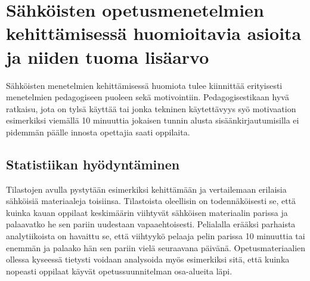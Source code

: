 \documentclass[utf8,bachelor]{gradu3}
\begin{document}
\section{Sähköisten opetusmenetelmien kehittämisessä huomioitavia asioita ja niiden tuoma lisäarvo}
Sähköisten menetelmien kehittämisessä huomiota tulee kiinnittää erityisesti menetelmien pedagogiseen puoleen sekä motivointiin. Pedagogisestikaan hyvä ratkaisu, jota on tylsä käyttää tai jonka tekninen käytettävyys syö motivaation esimerkiksi viemällä 10 minuuttia jokaisen tunnin alusta sisäänkirjautumisilla ei pidemmän päälle innosta opettajia saati oppilaita.

\subsection{Statistiikan hyödyntäminen}

Tilastojen avulla pystytään esimerkiksi kehittämään ja vertailemaan erilaisia sähköisiä materiaaleja toisiinsa. Tilastoista oleellisin on todennäköisesti se, että kuinka kauan oppilaat keskimäärin viihtyvät sähköisen materiaalin parissa ja palaavatko he sen pariin uudestaan vapaaehtoisesti. Pelialalla erääksi parhaista analytiikoista on havaittu se, että viihtyykö pelaaja pelin parissa 10 minuuttia tai enemmän ja palaako hän sen pariin vielä seuraavana päivänä. Opetusmateriaalien ollessa kyseessä tietysti voidaan analysoida myös esimerkiksi sitä, että kuinka nopeasti oppilaat käyvät opetussuunnitelman osa-alueita läpi.
 



\end{document}
